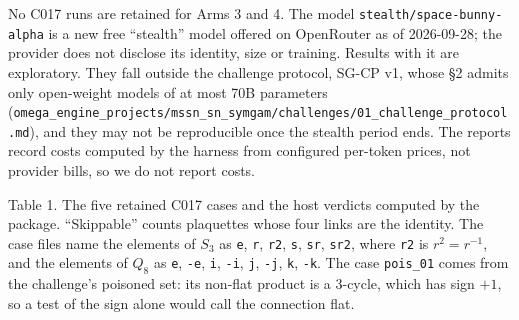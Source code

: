 \documentclass[
  11pt,
]{article}
\begin{document}
No C017 runs are retained for Arms 3 and 4. The model
\texttt{stealth/\allowbreak{}space-\allowbreak{}bunny-\allowbreak{}alpha}
is a new free ``stealth'' model offered on OpenRouter as of 2026-09-28;
the provider does not disclose its identity, size or training. Results
with it are exploratory. They fall outside the challenge protocol, SG-CP
v1, whose §2 admits only open-weight models of at most 70B parameters
(\texttt{omega\_\allowbreak{}engine\_\allowbreak{}projects/\allowbreak{}mssn\_\allowbreak{}sn\_\allowbreak{}symgam/\allowbreak{}challenges/\allowbreak{}01\_\allowbreak{}challenge\_\allowbreak{}protocol.md}),
and they may not be reproducible once the stealth period ends. The
reports record costs computed by the harness from configured per-token
prices, not provider bills, so we do not report costs.


Table 1. The five retained C017 cases and the host verdicts computed by
the package. ``Skippable'' counts plaquettes whose four links are the
identity. The case files name the elements of \(S_3\) as \texttt{e},
\texttt{r}, \texttt{r2}, \texttt{s}, \texttt{sr}, \texttt{sr2}, where
\texttt{r2} is \(r^2 = r^{-1}\), and the elements of \(Q_8\) as
\texttt{e}, \texttt{-\allowbreak{}e}, \texttt{i},
\texttt{-\allowbreak{}i}, \texttt{j}, \texttt{-\allowbreak{}j},
\texttt{k}, \texttt{-\allowbreak{}k}. The case
\texttt{pois\_\allowbreak{}01} comes from the challenge's poisoned set:
its non-flat product is a 3-cycle, which has sign \(+1\), so a test of
the sign alone would call the connection flat.
\end{document}
